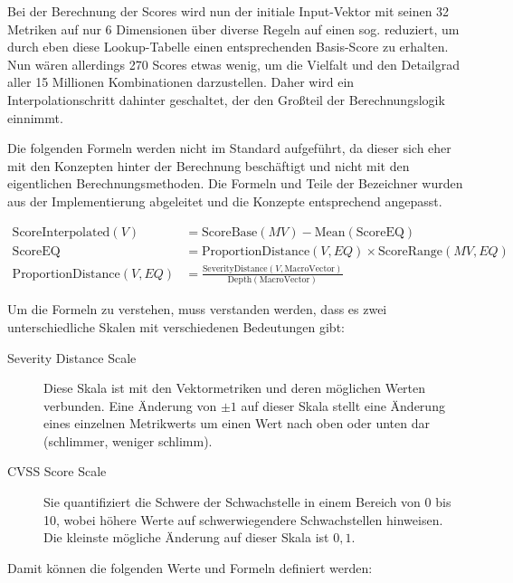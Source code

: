 Bei der Berechnung der Scores wird nun der initiale Input-Vektor mit seinen 32 Metriken auf nur 6 Dimensionen über diverse Regeln auf einen sog.  reduziert, um durch eben diese Lookup-Tabelle einen entsprechenden Basis-Score zu erhalten.
Nun wären allerdings 270 Scores etwas wenig, um die Vielfalt und den Detailgrad aller 15 Millionen Kombinationen darzustellen.
Daher wird ein Interpolationschritt dahinter geschaltet, der den Großteil der Berechnungslogik einnimmt.

Die folgenden Formeln werden nicht im Standard aufgeführt, da dieser sich eher mit den Konzepten hinter der Berechnung beschäftigt und nicht mit den eigentlichen Berechnungsmethoden.
Die Formeln und Teile der Bezeichner wurden aus der Implementierung abgeleitet und die Konzepte entsprechend angepasst.

\begin{align*}
    \text{ScoreInterpolated}(V) &= \text{ScoreBase}(MV) - \text{Mean}(\text{ScoreEQ}) \\
    \text{ScoreEQ} &= \text{ProportionDistance}(V, EQ) \times \text{ScoreRange}(MV, EQ) \\
    \text{ProportionDistance}(V, EQ) &= \frac{\text{SeverityDistance}(V, \text{MacroVector})}{\text{Depth}(\text{MacroVector})}
\end{align*}

Um die Formeln zu verstehen, muss verstanden werden, dass es zwei unterschiedliche Skalen mit verschiedenen Bedeutungen gibt:

\begin{description}
    \item[Severity Distance Scale] Diese Skala ist mit den Vektormetriken und deren möglichen Werten verbunden.
    Eine Änderung von $\pm 1$ auf dieser Skala stellt eine Änderung eines einzelnen Metrikwerts um einen Wert nach oben oder unten dar (schlimmer, weniger schlimm).
    \item[CVSS Score Scale] Sie quantifiziert die Schwere der Schwachstelle in einem Bereich von 0 bis 10, wobei höhere Werte auf schwerwiegendere Schwachstellen hinweisen.
    Die kleinste mögliche Änderung auf dieser Skala ist $0,1$.
\end{description}

Damit können die folgenden Werte und Formeln definiert werden:

